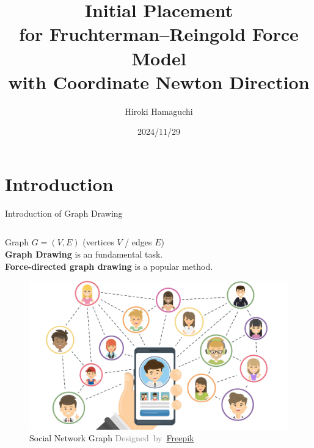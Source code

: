 \documentclass[dvipdfmx,13pt,aspectratio=169]{beamer}
\title{\huge{Initial Placement\\for Fruchterman--Reingold Force Model\\with Coordinate Newton Direction}}
\author{\Large{Hiroki Hamaguchi}}
\institute{\large{5th lab}\\\large{Supervisor: Prof. Akiko Takeda}}
\date{2024/11/29}
\newcommand{\gray}[1]{\textcolor{gray}{#1}}
\newif\ifShowHidden
\begin{document}
\maketitle

\section{Introduction}

\begin{frame}{Introduction of Graph Drawing}
  \begin{columns}
    \begin{column}{0.58\columnwidth}
      \large{%
        Graph $G = (V,E)$ (vertices $V$  / edges $E$)\\
        \textbf{Graph Drawing} \normalsize{is an fundamental task.}\\
        \textbf{Force-directed graph drawing} \normalsize{is a popular method.}
      }
      \begin{figure}[htbp]
        \centering
        \begin{minipage}{0.55\columnwidth}
          \centering
          \includegraphics[width=\columnwidth]{introExample/social.jpg}
          \caption*{
            Social Network Graph
            \gray{\footnotesize{Designed~by~\href{www.freepik.com}{Freepik}}}
          }
        \end{minipage}%
        \begin{minipage}{0.45\columnwidth}
          \centering

\end{minipage}
\end{figure}
\end{column}
\end{columns}
\end{frame}
\end{document}
